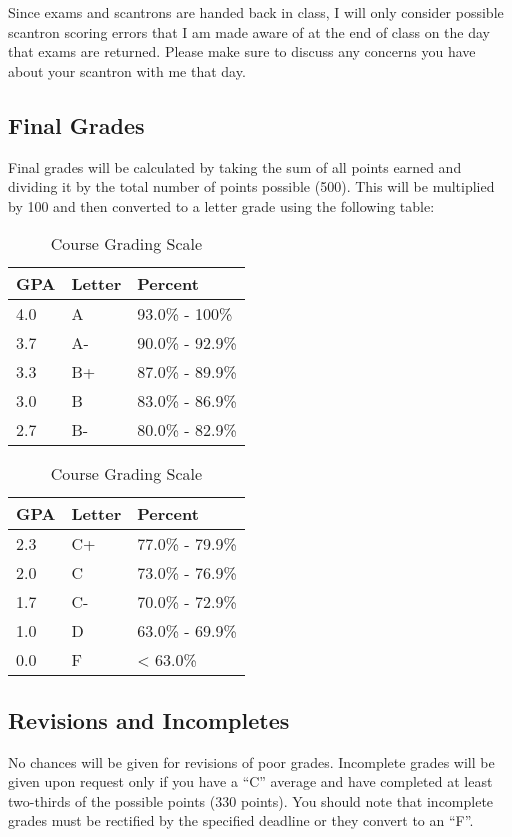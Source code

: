 \documentclass[]{book}
\theoremstyle{definition}
\theoremstyle{definition}
\theoremstyle{definition}
\theoremstyle{remark}
\begin{document}
Since exams and scantrons are handed back in class, I will only consider
possible scantron scoring errors that I am made aware of at the end of
class on the day that exams are returned. Please make sure to discuss
any concerns you have about your scantron with me that day.

\hypertarget{final-grades}{%
\subsection{Final Grades}\label{final-grades}}

Final grades will be calculated by taking the sum of all points earned
and dividing it by the total number of points possible (500). This will
be multiplied by 100 and then converted to a letter grade using the
following table:

\begin{table}
\caption{\label{tab:unnamed-chunk-8}Course Grading Scale}

\centering
\begin{tabular}[t]{lll}
\toprule
GPA & Letter & Percent\\
\midrule
4.0 & A & 93.0\% - 100\%\\
3.7 & A- & 90.0\% - 92.9\%\\
3.3 & B+ & 87.0\% - 89.9\%\\
3.0 & B & 83.0\% - 86.9\%\\
2.7 & B- & 80.0\% - 82.9\%\\
\bottomrule
\end{tabular}
\centering
\begin{tabular}[t]{lll}
\toprule
GPA & Letter & Percent\\
\midrule
2.3 & C+ & 77.0\% - 79.9\%\\
2.0 & C & 73.0\% - 76.9\%\\
1.7 & C- & 70.0\% - 72.9\%\\
1.0 & D & 63.0\% - 69.9\%\\
0.0 & F & < 63.0\%\\
\bottomrule
\end{tabular}
\end{table}

\hypertarget{revisions-and-incompletes}{%
\subsection{Revisions and Incompletes}\label{revisions-and-incompletes}}

No chances will be given for revisions of poor grades. Incomplete grades
will be given upon request only if you have a ``C'' average and have
completed at least two-thirds of the possible points (330 points). You
should note that incomplete grades must be rectified by the specified
deadline or they convert to an ``F''.
\end{document}

